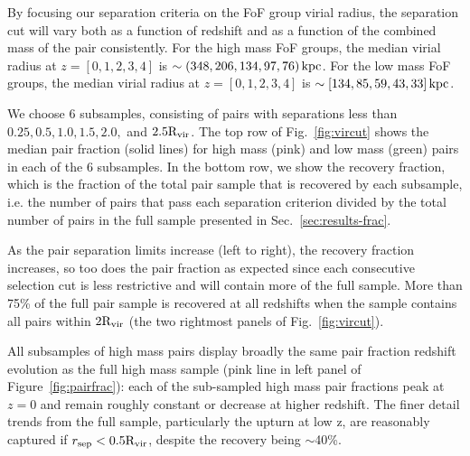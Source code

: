 \documentclass[twocolumn]{aastex631}
\newcommand{\Rvir}{\ensuremath{\rm R_{vir}}}
\begin{document}
    By focusing our separation criteria on the FoF group virial radius, the separation cut will vary both as a function of redshift and as a function of the combined mass of the pair consistently.
    For the high mass FoF groups, the median virial radius at $z=[0,1,2,3,4]$ is $\sim(348, 206, 134, 97, 76)\mathrm{\,kpc}$. 
    For the low mass FoF groups, the median virial radius at $z=[0,1,2,3,4]$ is $\sim[134, 85, 59, 43, 33]\mathrm{\,kpc}$.    
    
    We choose 6 subsamples, consisting of pairs with separations less than $0.25, 0.5, 1.0, 1.5, 2.0,$ and $2.5\Rvir$. 
    The top row of Fig.~\ref{fig:vircut} shows the median pair fraction (solid lines) for high mass (pink) and low mass (green) pairs in each of the 6 subsamples. 
    In the bottom row, we show the recovery fraction, which is the fraction of the total pair sample that is recovered by each subsample, i.e. the number of pairs that pass each separation criterion divided by the total number of pairs in the full sample presented in Sec.~\ref{sec:results-frac}.

    As the pair separation limits increase (left to right), the recovery fraction increases, so too does the pair fraction as expected since each consecutive selection cut is less restrictive and will contain more of the full sample. 
    More than 75\% of the full pair sample is recovered at all redshifts when the sample contains all pairs within $2\Rvir$ (the two rightmost panels of Fig.~\ref{fig:vircut}).

    All subsamples of high mass pairs display broadly the same pair fraction redshift evolution as the full high mass sample (pink line in left panel of Figure~\ref{fig:pairfrac}): each of the sub-sampled high mass pair fractions peak at $z=0$ and remain roughly constant or decrease at higher redshift. 
    The finer detail trends from the full sample, particularly the upturn at low z, are reasonably captured if $r_{\mathrm{sep}} < 0.5 \Rvir$, despite the recovery being $\sim$40\%. 
\end{document}
